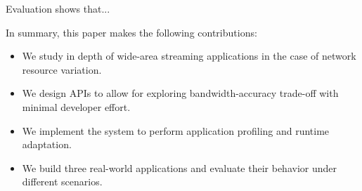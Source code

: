 Evaluation shows that...

In summary, this paper makes the following contributions:

\begin{itemize}[leftmargin=16pt]
\item We study in depth of wide-area streaming applications in the case of
  network resource variation.
\item We design APIs to allow for exploring bandwidth-accuracy trade-off with
  minimal developer effort.
\item We implement the system to perform application profiling and runtime
  adaptation.
\item We build three real-world applications and evaluate their behavior
  under different scenarios.
\end{itemize}

